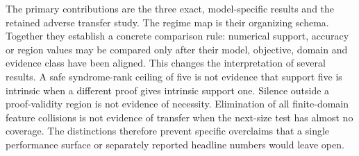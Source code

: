 The primary contributions are the three exact, model-specific results and the retained adverse transfer study.  The regime map is their organizing schema.  Together they establish a concrete comparison rule: numerical support, accuracy or region values may be compared only after their model, objective, domain and evidence class have been aligned.  This changes the interpretation of several results.  A safe syndrome-rank ceiling of five is not evidence that support five is intrinsic when a different proof gives intrinsic support one.  Silence outside a proof-validity region is not evidence of necessity.  Elimination of all finite-domain feature collisions is not evidence of transfer when the next-size test has almost no coverage.  The distinctions therefore prevent specific overclaims that a single performance surface or separately reported headline numbers would leave open.
